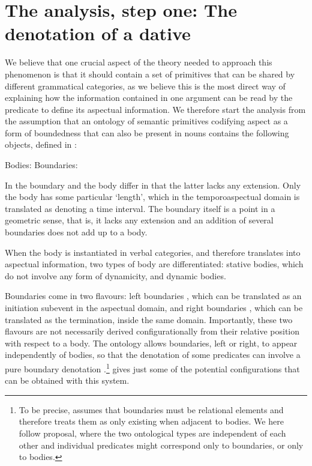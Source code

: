 \documentclass[output=paper,colorlinks,citecolor=brown,nonflat]{langsci/langscibook}
\begin{document}
\section{The analysis, step one: The denotation of a dative}\label{sec:fabregas:2}

We believe that one crucial aspect of the theory needed to approach this phenomenon is that it should contain a set of primitives that can be shared by different grammatical categories, as we believe this is the most direct way of explaining how the information contained in one argument can be read by the predicate to define its aspectual information. We therefore start the analysis from the assumption that an ontology of semantic primitives codifying aspect as a form of boundedness that can also be present in nouns contains the following objects, defined in \citet{Piñón1997}:

\ea%
    \label{ex:fabregas:13}
    \ea\label{ex:fabregas:13a}
    Bodies: {\midline}
    \ex\label{ex:fabregas:13b}
    Boundaries: {\textbar}
    \z
\z

In \citet{Piñón1997} the boundary and the body differ in that the latter lacks any extension. Only the body has some particular `length', which in the temporoaspectual domain is translated as denoting a time interval. The boundary itself is a point in a geometric sense, that is, it lacks any extension and an addition of several boundaries does not add up to a body.

When the body is instantiated in verbal categories, and therefore translates into aspectual information, two types of body are differentiated: stative bodies, which do not involve any form of dynamicity, and dynamic bodies.

Boundaries come in two flavours: left boundaries , which can be translated as an initiation subevent in the aspectual domain, and right boundaries , which can be translated as the termination, inside the same domain. Importantly, these two flavours are not necessarily derived configurationally from their relative position with respect to a body. The ontology allows boundaries, left or right, to appear independently of bodies, so that the denotation of some predicates can involve a pure boundary denotation \citep{MarínMcNally2011}.\footnote{To be precise, \citet{Piñón1997} assumes that boundaries must be relational elements and therefore treats them as only existing when adjacent to bodies. We here follow  proposal, where the two ontological types are independent of each other and individual predicates might correspond only to boundaries, or only to bodies.}  gives just some of the potential configurations that can be obtained with this system.
\end{document}
